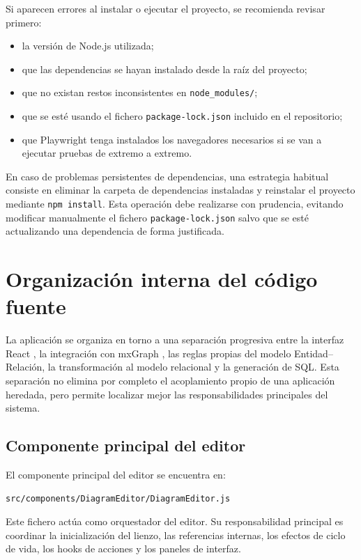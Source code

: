 Si aparecen errores al instalar o ejecutar el proyecto, se recomienda revisar primero:

\begin{itemize}
\item la versión de Node.js utilizada;
\item que las dependencias se hayan instalado desde la raíz del proyecto;
\item que no existan restos inconsistentes en \texttt{node\_modules/};
\item que se esté usando el fichero \texttt{package-lock.json} incluido en el repositorio;
\item que Playwright tenga instalados los navegadores necesarios si se van a ejecutar pruebas de extremo a extremo.
\end{itemize}

En caso de problemas persistentes de dependencias, una estrategia habitual consiste en eliminar la carpeta de dependencias instaladas y reinstalar el proyecto mediante \texttt{npm install}. Esta operación debe realizarse con prudencia, evitando modificar manualmente el fichero \texttt{package-lock.json} salvo que se esté actualizando una dependencia de forma justificada.

\section{Organización interna del código fuente}

La aplicación se organiza en torno a una separación progresiva entre la interfaz React \cite{react}, la integración con mxGraph \cite{mxgraph}, las reglas propias del modelo Entidad--Relación, la transformación al modelo relacional y la generación de SQL. Esta separación no elimina por completo el acoplamiento propio de una aplicación heredada, pero permite localizar mejor las responsabilidades principales del sistema.

\subsection{Componente principal del editor}

El componente principal del editor se encuentra en:

\begin{verbatim}
src/components/DiagramEditor/DiagramEditor.js
\end{verbatim}

Este fichero actúa como orquestador del editor. Su responsabilidad principal es coordinar la inicialización del lienzo, las referencias internas, los efectos de ciclo de vida, los hooks de acciones y los paneles de interfaz.

